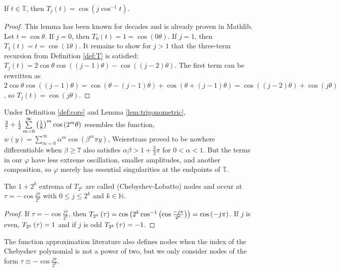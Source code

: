 \begin{lemma}[]
  \label{lem:trigonometric}
  \leanok
  If $t \in \mathbb{T}$, then $T_j\left(t\right) = \cos\left(j \cos^{-1}t\right)$.
\end{lemma}
  
\begin{proof}
  \leanok
  This lemma has been known for decades and is already proven in Mathlib. Let $t = \cos \theta$. If $j = 0$, then $T_0\left(t\right) = 1 = \cos\left(0 \theta\right)$. If $j = 1$, then $T_1\left(t\right) = t = \cos\left(1 \theta\right)$. It remains to show for $j > 1$ that the three-term recursion from Definition \ref{def:T} is satisfied: $T_j\left(t\right) = 2 \cos \theta \cos\left(\left(j - 1\right) \theta\right) - \cos\left(\left(j - 2\right) \theta\right)$. The first term can be rewritten as $2\cos \theta \cos\left(\left(j - 1\right) \theta\right) = \cos\left(\theta - \left(j - 1\right)\theta\right) + \cos\left(\theta + \left(j - 1\right)\theta\right) = \cos\left(\left(j - 2\right)\theta\right) + \cos\left(j \theta\right)$, so $T_j\left(t\right) = \cos\left(j \theta\right)$.
\end{proof}

\begin{remark*}
Under Definition \ref{def:core} and Lemma \ref{lem:trigonometric}, $\frac{3}{7} + \frac{1}{2} \sum\limits_{m = 0}^\infty \left(\frac{1}{8}\right)^{m} \cos\left(2^m \theta\right)$ resembles the function, $w\left(y\right) = \sum\limits_{m = 0}^\infty \alpha^m \cos\left(\beta^m \pi y\right)$, Weierstrass proved to be nowhere differentiable when $\beta \geq 7$ also satisfies $\alpha \beta > 1 + \frac{3}{2} \pi$ for $0 < \alpha < 1$. But the terms in our $\varphi$ have less extreme oscillation, smaller amplitudes, and another composition, so $\varphi$ merely has essential singularities at the endpoints of $\mathbb{T}$.
\end{remark*}

\begin{lemma}
  \label{lem:nodes}
  The $1 + 2^k$ extrema of $T_{2^k}$ are called (Chebyshev-Lobatto) nodes and occur at $\tau = -\cos\frac{j\pi}{2^k}$ with $0 \leq j \leq 2^k$ and $k \in \mathbb{N}$.
\end{lemma}
\begin{proof}
  If $\tau = -\cos\frac{j\pi}{2^k}$, then $\TT[\tau]{k} = \cos\left(2^k \cos^{-1}\left(\cos \frac{-j\pi}{2^k}\right)\right) = \cos\left(-j\pi\right)$. If $j$ is even, $\TT[\tau]{k} = 1$ and if $j$ is odd $\TT[\tau]{k} = -1$.
\end{proof}
The function approximation literature also defines nodes when the index of the Chebyshev polynomial is not a power of two, but we only consider nodes of the form $\tau \equiv -\cos\frac{j\pi}{2^k}$.

